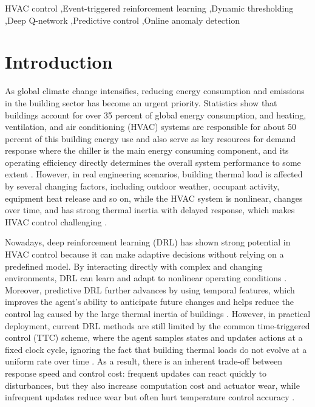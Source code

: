 ﻿\documentclass[preprint,12pt,number]{elsarticle}
\begin{document}
\begin{frontmatter}
\begin{keyword}
HVAC control \sep Event-triggered reinforcement learning \sep Dynamic thresholding \sep Deep Q-network \sep Predictive control \sep Online anomaly detection
\end{keyword}

\end{frontmatter}

\linenumbers

\section{Introduction}\label{introduction}

As global climate change intensifies, reducing energy consumption and emissions in the building sector has become an urgent priority. Statistics show that buildings account for over 35 percent of global energy consumption, and heating, ventilation, and air conditioning (HVAC) systems are responsible for about 50 percent of this building energy use and also serve as key resources for demand response where the chiller is the main energy consuming component, and its operating efficiency directly determines the overall system performance to some extent \cite{ref1}. However, in real engineering scenarios, building thermal load is affected by several changing factors, including outdoor weather, occupant activity, equipment heat release and so on, while the HVAC system is nonlinear, changes over time, and has strong thermal inertia with delayed response, which makes HVAC control challenging \cite{ref2}.

Nowadays, deep reinforcement learning (DRL) has shown strong potential in HVAC control because it can make adaptive decisions without relying on a predefined model. By interacting directly with complex and changing environments, DRL can learn and adapt to nonlinear operating conditions \cite{ref3}. Moreover, predictive DRL further advances by using temporal features, which improves the agent's ability to anticipate future changes and helps reduce the control lag caused by the large thermal inertia of buildings \cite{ref4}. However, in practical deployment, current DRL methods are still limited by the common time-triggered control (TTC) scheme, where the agent samples states and updates actions at a fixed clock cycle, ignoring the fact that building thermal loads do not evolve at a uniform rate over time \cite{ref5}. As a result, there is an inherent trade-off between response speed and control cost: frequent updates can react quickly to disturbances, but they also increase computation cost and actuator wear, while infrequent updates reduce wear but often hurt temperature control accuracy \cite{ref6}.
\end{document}
